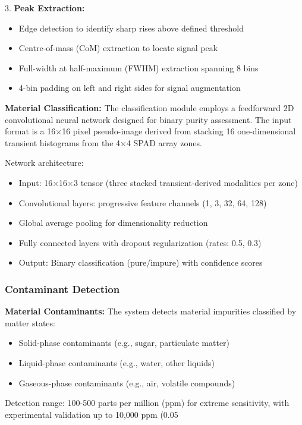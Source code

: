 \documentclass[11pt,a4paper]{article}
\begin{document}
\begin{enumerate}[leftmargin=*,label=\alph*)]
3. \textbf{Peak Extraction:}
\begin{itemize}[leftmargin=*]
\item Edge detection to identify sharp rises above defined threshold
\item Centre-of-mass (CoM) extraction to locate signal peak
\item Full-width at half-maximum (FWHM) extraction spanning 8 bins
\item 4-bin padding on left and right sides for signal augmentation
\end{itemize}

\textbf{Material Classification:}
The classification module employs a feedforward 2D convolutional neural network designed for binary purity assessment. The input format is a 16$\times$16 pixel pseudo-image derived from stacking 16 one-dimensional transient histograms from the 4$\times$4 SPAD array zones.

Network architecture:
\begin{itemize}[leftmargin=*]
\item Input: 16$\times$16$\times$3 tensor (three stacked transient-derived modalities per zone)
\item Convolutional layers: progressive feature channels (1, 3, 32, 64, 128)
\item Global average pooling for dimensionality reduction
\item Fully connected layers with dropout regularization (rates: 0.5, 0.3)
\item Output: Binary classification (pure/impure) with confidence scores
\end{itemize}

\subsubsection{Contaminant Detection}

\textbf{Material Contaminants:}
The system detects material impurities classified by matter states:
\begin{itemize}[leftmargin=*]
\item Solid-phase contaminants (e.g., sugar, particulate matter)
\item Liquid-phase contaminants (e.g., water, other liquids)
\item Gaseous-phase contaminants (e.g., air, volatile compounds)
\end{itemize}

Detection range: 100-500 parts per million (ppm) for extreme sensitivity, with experimental validation up to 10,000 ppm (0.05%


\end{enumerate}
\end{document}

